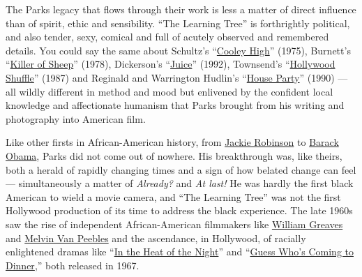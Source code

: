The Parks legacy that flows through their work is less a matter of
direct influence than of spirit, ethic and sensibility. ``The Learning
Tree'' is forthrightly political, and also tender, sexy, comical and
full of acutely observed and remembered details. You could say the same
about Schultz's
``\href{https://www.nytimes3xbfgragh.onion/watching/titles/movies/1000120485}{Cooley
High}'' (1975), Burnett's
``\href{https://www.imdb.com/title/tt0076263/}{Killer of Sheep}''
(1978), Dickerson's
``\href{https://www.nytimes3xbfgragh.onion/watching/titles/movies/1000121318}{Juice}''
(1992), Townsend's
``\href{https://www.nytimes3xbfgragh.onion/watching/titles/movies/1000022175}{Hollywood
Shuffle}'' (1987) and Reginald and Warrington Hudlin's
``\href{https://www.nytimes3xbfgragh.onion/watching/titles/house-party}{House
Party}'' (1990) --- all wildly different in method and mood but
enlivened by the confident local knowledge and affectionate humanism
that Parks brought from his writing and photography into American film.

Like other firsts in African-American history, from
\href{https://www.nytimes3xbfgragh.onion/topic/person/jackie-robinson}{Jackie
Robinson} to
\href{https://www.nytimes3xbfgragh.onion/topic/person/barack-obama}{Barack
Obama}, Parks did not come out of nowhere. His breakthrough was, like
theirs, both a herald of rapidly changing times and a sign of how
belated change can feel --- simultaneously a matter of \emph{Already?}
and \emph{At last!} He was hardly the first black American to wield a
movie camera, and ``The Learning Tree'' was not the first Hollywood
production of its time to address the black experience. The late 1960s
saw the rise of independent African-American filmmakers like
\href{https://www.nytimes3xbfgragh.onion/2014/08/27/arts/william-greaves-a-documentarian-and-pioneering-journalist-dies-at-87.html}{William
Greaves} and
\href{https://www.nytimes3xbfgragh.onion/2013/09/20/arts/design/melvin-van-peebles-headlines-a-group-art-show.html}{Melvin
Van Peebles} and the ascendance, in Hollywood, of racially enlightened
dramas like
``\href{https://www.nytimes3xbfgragh.onion/watching/recommendations/watching-film-in-the-heat-of-the-night}{In
the Heat of the Night}'' and
``\href{https://www.nytimes3xbfgragh.onion/watching/titles/guess-whos-coming-to-dinner}{Guess
Who's Coming to Dinner},'' both released in 1967.

